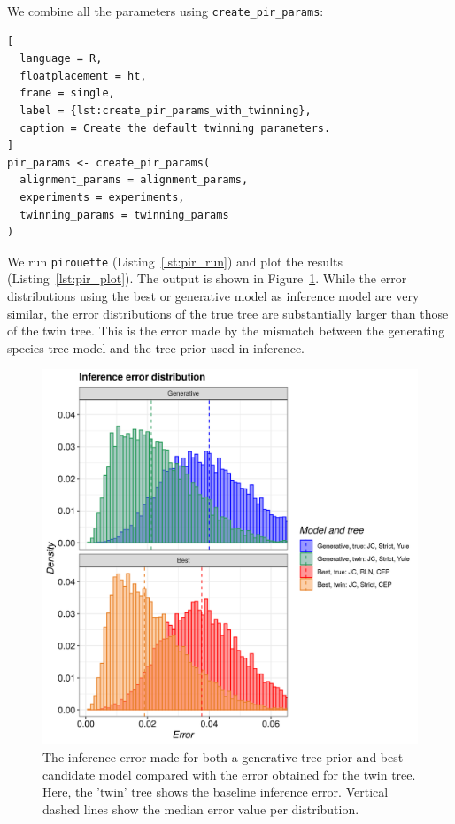 We combine all the parameters using \verb;create_pir_params;:

\begin{lstlisting}[
  language = R,
  floatplacement = ht,
  frame = single,
  label = {lst:create_pir_params_with_twinning},
  caption = Create the default twinning parameters.
]
pir_params <- create_pir_params(
  alignment_params = alignment_params,
  experiments = experiments,
  twinning_params = twinning_params
)
\end{lstlisting}

We run \verb;pirouette; (Listing~\ref{lst:pir_run}) 
and plot the results (Listing~\ref{lst:pir_plot}).
The output is shown in Figure~\ref{fig:example_3}. 
While the error distributions using the best or generative model 
as inference model are very similar, 
the error distributions of the true tree are substantially 
larger than those of the twin tree. 
This is the error made by the mismatch
between the generating species tree model and the tree prior used in inference.

\begin{figure}[H]
  \includegraphics[width=\textwidth]{pirouette_example_3/example_3_314/errors.png}
  \caption{
    The inference error made 
    for both a generative tree prior and best candidate model
    compared with the error obtained for the twin tree.
    Here, the 'twin' tree shows the baseline inference error.
    Vertical dashed lines show the median error value per distribution.
  }
  \label{fig:example_3}
\end{figure}

